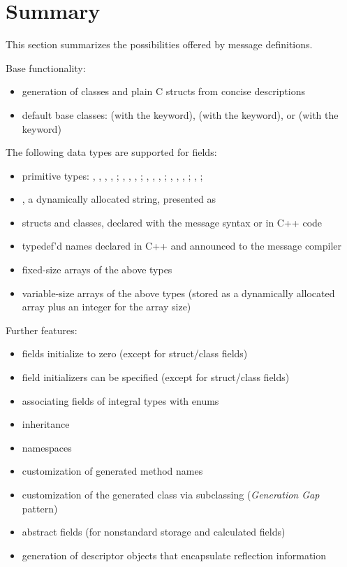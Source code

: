 \section{Summary}
\label{sec:msg-defs:summary}

This section summarizes the possibilities offered by message definitions.

Base functionality:

\begin{itemize}
  \item  generation of classes and plain C structs from concise descriptions
  \item  default base classes:
     (with the  keyword),
     (with the  keyword), or
     (with the  keyword)
\end{itemize}

The following data types are supported for fields:

\begin{itemize}
  \item  primitive types:
    , , , , ;
    , , , ;
    , , , ;
    , , , ;
    , ; 
  \item  {}, a dynamically allocated string, presented as 
  \item  structs and classes, declared with the message syntax or in C++ code
  \item  typedef'd names declared in C++ and announced to the message compiler
  \item  fixed-size arrays of the above types
  \item  variable-size arrays of the above types (stored as a dynamically
    allocated array plus an integer for the array size)
\end{itemize}

Further features:

\begin{itemize}
  \item  fields initialize to zero (except for struct/class fields)
  \item  field initializers can be specified (except for struct/class fields)
  \item  associating fields of integral types with enums
  \item  inheritance
  \item  namespaces
  \item  customization of generated method names
  \item  customization of the generated class via subclassing (\textit{Generation Gap} pattern)
  \item  abstract fields (for nonstandard storage and calculated fields)
  \item  generation of descriptor objects that encapsulate reflection information
\end{itemize}

